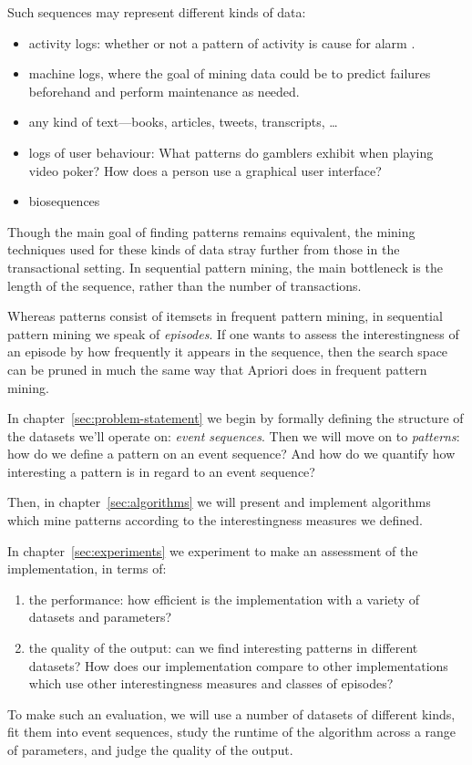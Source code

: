 Such sequences may represent different kinds of data:
\begin{itemize}
\item activity logs: whether or not a pattern of activity is cause for alarm \cite{mannila1997discovery}.
\item machine logs, where the goal of mining data could be to predict failures beforehand and perform maintenance as needed.
\item any kind of text---books, articles, tweets, transcripts, \ldots
\item logs of user behaviour: What patterns do gamblers exhibit when playing video poker? How does a person use a graphical user interface?
\item biosequences \cite{biosequences}
\end{itemize}

Though the main goal of finding patterns remains equivalent, the mining techniques used for these kinds of data stray further from those in the transactional setting. In sequential pattern mining, the main bottleneck is the length of the sequence, rather than the number of transactions.

Whereas patterns consist of itemsets in frequent pattern mining, in sequential pattern mining we speak of \emph{episodes}. If one wants to assess the interestingness of an episode by how frequently it appears in the sequence, then the search space can be pruned in much the same way that Apriori does in frequent pattern mining.

In chapter~\ref{sec:problem-statement} we begin by formally defining the structure of the datasets we'll operate on: \emph{event sequences}. Then we will move on to \emph{patterns}: how do we define a pattern on an event sequence?
And how do we quantify how interesting a pattern is in regard to an event sequence?

Then, in chapter~\ref{sec:algorithms} we will present and implement algorithms which mine patterns according to the interestingness measures we defined.

In chapter~\ref{sec:experiments} we experiment to make an assessment of the implementation, in terms of:

\begin{enumerate}
\item the performance: how efficient is the implementation with a variety of datasets and parameters?
\item the quality of the output: can we find interesting patterns in different datasets? How does our implementation compare to other implementations which use other interestingness measures and classes of episodes?
\end{enumerate}

To make such an evaluation, we will use a number of datasets of different kinds, fit them into event sequences, study the runtime of the algorithm across a range of parameters, and judge the quality of the output.
